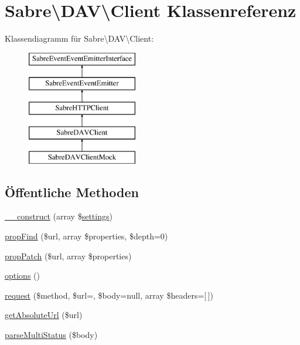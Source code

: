 \hypertarget{class_sabre_1_1_d_a_v_1_1_client}{}\section{Sabre\textbackslash{}D\+AV\textbackslash{}Client Klassenreferenz}
\label{class_sabre_1_1_d_a_v_1_1_client}
Klassendiagramm für Sabre\textbackslash{}D\+AV\textbackslash{}Client\+:\begin{figure}[H]
\begin{center}
\leavevmode
\includegraphics[height=5.000000cm]{class_sabre_1_1_d_a_v_1_1_client}
\end{center}
\end{figure}
\subsection*{Öffentliche Methoden}
\begin{DoxyCompactItemize}
\item 
\mbox{\hyperlink{class_sabre_1_1_d_a_v_1_1_client_ad58bff2d9312f25d4c543e60dcad72b6}{\+\_\+\+\_\+construct}} (array \$\mbox{\hyperlink{classsettings}{settings}})
\item 
\mbox{\hyperlink{class_sabre_1_1_d_a_v_1_1_client_a9f3eff7170d762f36ba94ce6eb63912f}{prop\+Find}} (\$url, array \$properties, \$depth=0)
\item 
\mbox{\hyperlink{class_sabre_1_1_d_a_v_1_1_client_ab259f219f41fe1a152f49225df2b632f}{prop\+Patch}} (\$url, array \$properties)
\item 
\mbox{\hyperlink{class_sabre_1_1_d_a_v_1_1_client_aa90829863502b6b04c4984ea0779dd6a}{options}} ()
\item 
\mbox{\hyperlink{class_sabre_1_1_d_a_v_1_1_client_a6255d861b39ab83e7807d3c3f5503829}{request}} (\$method, \$url=\textquotesingle{}\textquotesingle{}, \$body=null, array \$headers=\mbox{[}$\,$\mbox{]})
\item 
\mbox{\hyperlink{class_sabre_1_1_d_a_v_1_1_client_a4bc2a41e4e3b071abe849782e8d3c1f5}{get\+Absolute\+Url}} (\$url)
\item 
\mbox{\hyperlink{class_sabre_1_1_d_a_v_1_1_client_a06d8fa74595cb429c2efdb718f775a9c}{parse\+Multi\+Status}} (\$body)
\end{DoxyCompactItemize}
